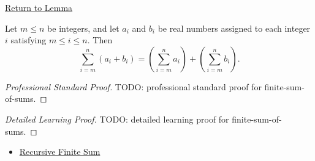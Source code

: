 \newpage
{}
\label{prf:finite-sum-of-sums}

\begin{remark*}[Return]
\hyperref[lem:finite-sum-of-sums]{Return to Lemma}
\end{remark*}

\begin{lemma*}
Let \(m \le n\) be integers, and let \(a_i\) and \(b_i\) be real
numbers assigned to each integer \(i\) satisfying \(m \le i \le n\).
Then
\[
  \sum_{i=m}^{n} (a_i+b_i)
  =
  \left(\sum_{i=m}^{n} a_i\right)
  +
  \left(\sum_{i=m}^{n} b_i\right).
\]
\end{lemma*}

\begin{proof}[Professional Standard Proof]
\LRAProofBodyStart
TODO: professional standard proof for finite-sum-of-sums.
\end{proof}

\begin{proof}[Detailed Learning Proof]
\LRAProofBodyStart
TODO: detailed learning proof for finite-sum-of-sums.
\end{proof}

\begin{remark*}
\end{remark*}

\begin{dependencies}
\begin{itemize}
  \item \hyperref[def:recursive-finite-sum]{Recursive Finite Sum}
\end{itemize}
\end{dependencies}

\clearpage
